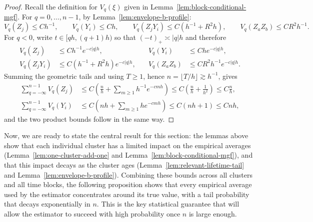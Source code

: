 \documentclass{article}
\begin{document}
\begin{proof}
Recall the definition for $V_q(\xi)$ given in Lemma~\ref{lem:block-conditional-mgf}. For $q=0,\dots,n-1$, by Lemma~\ref{lem:envelope-b-profile}:
\[
V_q(Z_j)\le C h^{-1},
\qquad
V_q(Y_i)\le C h,
\qquad
V_q(Z_jY_i)\le C(h^{-1}+R^2 h),
\qquad
V_q(Z_aZ_b)\le C R^2 h^{-1}.
\]
For $q<0$, write $t\in[qh,(q+1)h)$ so that $(-t)_+\asymp |q|h$ and therefore
\begin{align*}
    V_q(Z_j)&\le C h^{-1}e^{-c|q|h},
\quad
&V_q(Y_i)&\le C h e^{-c|q|h}, \\
V_q(Z_jY_i)&\le C(h^{-1}+R^2 h)e^{-c|q|h},
\quad
&V_q(Z_aZ_b)&\le C R^2 h^{-1}e^{-c|q|h}.
\end{align*}
Summing the geometric tails and using $T\ge 1$, hence $n=\lfloor T/h\rfloor\gtrsim h^{-1}$, gives
\begin{align*}
\sum_{q=-\infty}^{n-1}V_q(Z_j)
&\le C\left(\frac{n}{h}+\sum_{m\ge 1} h^{-1}e^{-cmh}\right)
\le C\left(\frac{n}{h}+\frac1{h^2}\right)
\le C\frac{n}{h},\\
\sum_{q=-\infty}^{n-1}V_q(Y_i)
&\le C\left(nh+\sum_{m\ge 1} he^{-cmh}\right)
\le C(nh+1)
\le Cnh,
\end{align*}
and the two product bounds follow in the same way.
\end{proof}
Now, we are ready to state the central result for this section: the lemmas above show that each individual cluster has a limited impact on the empirical averages (Lemma~\ref{lem:one-cluster-add-one} and Lemma~\ref{lem:block-conditional-mgf}), and that this impact decays as the cluster ages (Lemma~\ref{lem:relevant-lifetime-tail} and Lemma~\ref{lem:envelope-b-profile}). Combining these bounds across all clusters and all time blocks, the following proposition shows that every empirical average used by the estimator concentrates around its true value, with a tail probability that decays exponentially in $n$. This is the key statistical guarantee that will allow the estimator to succeed with high probability once $n$ is large enough.
\end{document}
